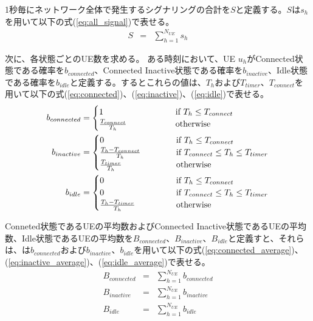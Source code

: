 \documentclass[a4j]{ujarticle}
\begin{document}
1秒毎にネットワーク全体で発生するシグナリングの合計を$S$と定義する。$S$は$s_h$を用いて以下の式(\ref{eq:all_signal})で表せる。
\begin{eqnarray}
  S & = & \sum_{h = 1}^{N_{UE}} s_h \label{eq:all_signal}
\end{eqnarray}

次に、各状態ごとのUE数を求める。
ある時刻において、UE $u_h$がConnected状態である確率を$b_{connected}$、Connected Inactive状態である確率を$b_{inactive}$、Idle状態である確率を$b_{idle}$と定義する。するとこれらの値は、$T_h$および$T_{timer}$、$T_{connect}$を用いて以下の式(\ref{eq:connected})、(\ref{eq:inactive})、(\ref{eq:idle})で表せる。
\begin{align}
	b_{connected} & =
	\begin{cases}
    1 \hphantom{100000000000000} & \text{if $T_h \le T_{connect}$}\\
    \frac{T_{connect}}{T_h} & \text{otherwise}
  \end{cases} \label{eq:connected}\\
	b_{inactive} & =
  \begin{cases}
    0 \hphantom{100000000000000} & \text{if $T_h \le T_{connect}$}\\
		\frac{T_h - T_{connect}}{T_h} & \text{if $T_{connect} \le T_h \le T_{timer}$}\\
    \frac{T_{timer}}{T_h} & \text{otherwise}
  \end{cases} \label{eq:inactive}\\
	b_{idle} & =
  \begin{cases}
    0 \hphantom{100000000000000} & \text{if $T_h \le T_{connect}$}\\
		0 & \text{if $T_{connect} \le T_h \le T_{timer}$}\\
    \frac{T_h - T_{timer}}{T_h} & \text{otherwise}
  \end{cases}\label{eq:idle}
\end{align}

Conneted状態であるUEの平均数およびConnected Inactive状態であるUEの平均数、Idle状態であるUEの平均数を$B_{connected}$、$B_{inactive}$、$B_{idle}$と定義すと、それらは、は$b_{connected}$および$b_{inactive}$、$b_{idle}$を用いて以下の式(\ref{eq:connected_average})、(\ref{eq:inactive_average})、(\ref{eq:idle_average})で表せる。
\begin{eqnarray}
  B_{connected} & = & \sum_{h = 1}^{N_{UE}} b_{connected} \label{eq:connected_average}\\
	B_{inactive} & = & \sum_{h = 1}^{N_{UE}} b_{inactive} \label{eq:inactive_average}\\
	B_{idle} & = & \sum_{h = 1}^{N_{UE}} b_{idle} \label{eq:idle_average}
\end{eqnarray}
\end{document}
